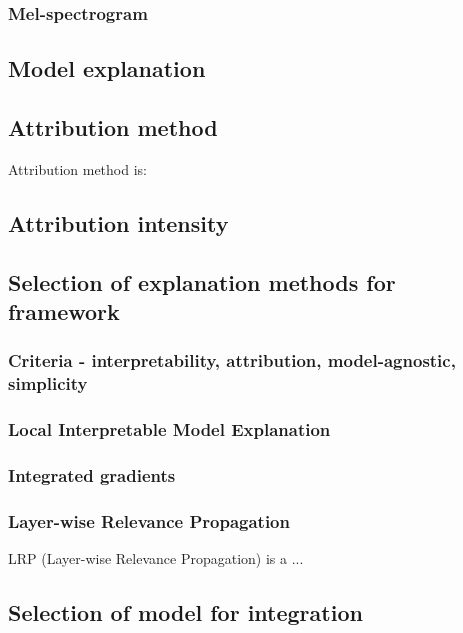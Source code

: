\documentclass[
    bindingoffset=5mm,  %
    footnoteindent=3mm, %
    hyphenation=true    %
]{src/wut-thesis}
\begin{document}
\subsubsection{Mel-spectrogram}

\subsection{Model explanation} %

\subsection{Attribution method} \label{ch2:AttributionMethod}

Attribution method is:

\subsection{Attribution intensity} \label{ch2:AttrIntensity}


\subsection{Selection of explanation methods for framework}
\subsubsection{Criteria - interpretability, attribution, model-agnostic, simplicity}
\subsubsection{Local Interpretable Model Explanation} \label{ch2:audioLIME} %
\subsubsection{Integrated gradients} \label{ch2:IgradMethod}
\subsubsection{Layer-wise Relevance Propagation} \label{ch2:LrpMethod}

LRP (Layer-wise Relevance Propagation) \cite{Binder2016-oa} is a ...

\subsection{Selection of model for integration} \label{ch2:ModelSelection}
\end{document}
